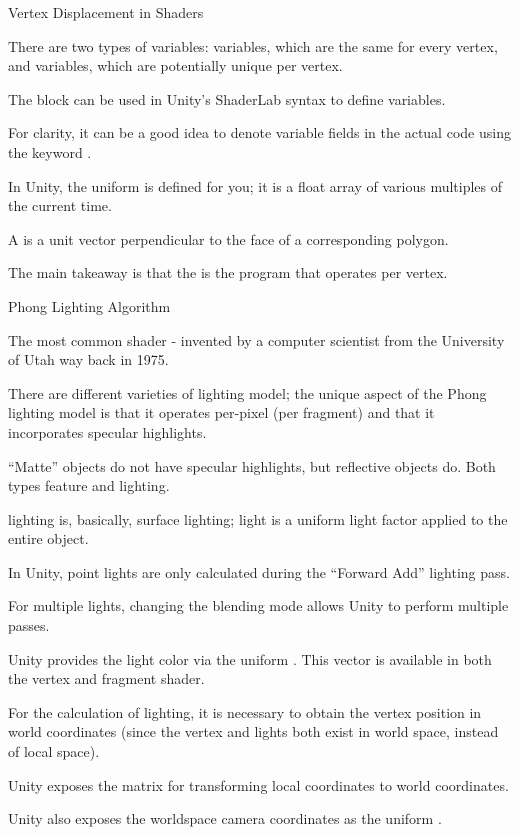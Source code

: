 \documentclass[11pt]{article}
\begin{document}
\maketitle

\begin{topic}{Vertex Displacement in Shaders}
	\item There are two types of variables:  variables, which are the same for every vertex, and \term{} variables, which are potentially unique per vertex.
	\item The  block can be used in Unity's ShaderLab syntax to define  variables.
	\item For clarity, it can be a good idea to denote variable fields in the actual code using the keyword .
	\item In Unity, the  uniform is defined for you; it is a float array of various multiples of the current time.
	\item A  is a unit vector perpendicular to the face of a corresponding polygon.
	\item The main takeaway is that the  is the program that operates per vertex.
\end{topic}

\begin{topic}{Phong Lighting Algorithm}
	\item The most common shader - invented by a computer scientist from the University of Utah way back in 1975.
	\item There are different varieties of lighting model; the unique aspect of the Phong lighting model is that it operates per-pixel (per fragment) and that it incorporates specular highlights.
	\item ``Matte'' objects do not have specular highlights, but reflective objects do. Both types feature  and  lighting.
	\item {} lighting is, basically, surface lighting;  light is a uniform light factor applied to the entire object.
	\item In Unity, point lights are only calculated during the ``Forward Add'' lighting pass.
	\item For multiple lights, changing the blending mode allows Unity to perform multiple passes.
	\item Unity provides the light color via the uniform . This vector is available in both the vertex and fragment shader.
	\item For the calculation of lighting, it is necessary to obtain the vertex position in world coordinates (since the vertex and lights both exist in world space, instead of local space).
	\item Unity exposes the  matrix for transforming local coordinates to world coordinates.
	\item Unity also exposes the worldspace camera coordinates as the uniform .
\end{topic}
\end{document}
